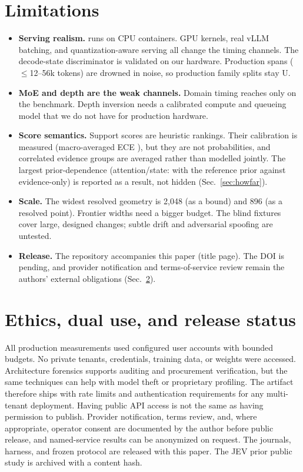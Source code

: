 \section{Limitations}
\label{sec:limitations}
\begin{itemize}
\item \textbf{Serving realism.}  \benchname{} runs on CPU containers.  GPU kernels,
  real vLLM batching, and quantization-aware serving all change the timing channels.
  The decode-state discriminator is validated on our hardware.  Production spans
  ($\le$12--56k tokens) are drowned in noise, so production family splits stay U.
\item \textbf{MoE and depth are the weak channels.}  Domain timing reaches only
  \MoeAcc{} on the benchmark.  Depth inversion needs a calibrated compute and queueing
  model that we do not have for production hardware.
\item \textbf{Score semantics.}  Support scores are heuristic rankings.  Their
  calibration is measured (macro-averaged ECE \BenchECE{} \BenchECEMacroCI{}), but they
  are not probabilities, and correlated evidence groups are averaged rather than modelled
  jointly.  The largest prior-dependence (attention/state: \AttnRefAcc{} with the
  reference prior against \AttnFlatAcc{} evidence-only) is reported as a result, not
  hidden (Sec.~\ref{sec:howfar}).
\item \textbf{Scale.}  The widest resolved geometry is 2{,}048 (as a bound) and 896 (as
  a resolved point).  Frontier widths need a bigger budget.  The blind fixtures cover
  large, designed changes; subtle drift and adversarial spoofing are untested.
\item \textbf{Release.}  The repository accompanies this paper (title page).  The DOI is
  pending, and provider notification and terms-of-service review remain the authors'
  external obligations (Sec.~\ref{sec:ethics}).
\end{itemize}

\section{Ethics, dual use, and release status}
\label{sec:ethics}
All production measurements used configured user accounts with bounded budgets.  No
private tenants, credentials, training data, or weights were accessed.  Architecture
forensics supports auditing and procurement verification, but the same techniques can
help with model theft or proprietary profiling.  The artifact therefore ships with rate
limits and authentication requirements for any multi-tenant deployment.  Having public
API access is not the same as having permission to publish.  Provider notification,
terms review, and, where appropriate, operator consent are documented by the author
before public release, and named-service results can be anonymized on request.  The
\benchname{} journals, harness, and frozen protocol are released with this paper.  The
JEV prior public study is archived with a content hash.

